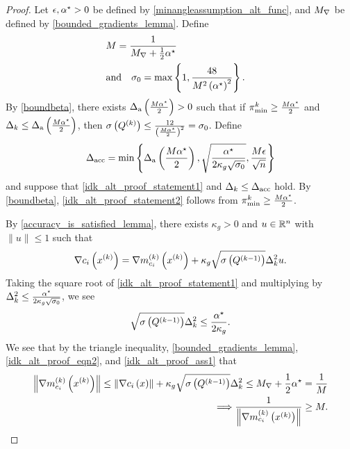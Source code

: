 \begin{proof}

Let $\epsilon, { \alpha^{\star} } > 0$ be defined by \cref{minangleassumption_alt_func}, and ${M_{\nabla}}$ be defined by \cref{bounded_gradients_lemma}.
Define
\begin{align}
&M = \frac 1 {{M_{\nabla}} + \frac 1 2 { \alpha^{\star} }} & \\
&\textrm{and} \quad \sigma_0 = \max\left\{1, \frac{48}{M^2\left({ \alpha^{\star} }\right)^2}\right\}.&
\end{align}
By \cref{boundbeta}, there exists ${\Delta_{\textrm{a}}} \left(\frac {M { \alpha^{\star} }} 2\right) > 0$ such that if
${\pi^k_{\textrm{min}}} \ge \frac {M { \alpha^{\star} }} 2$ and $\Delta_k \le {\Delta_{\textrm{a}}} \left(\frac {M { \alpha^{\star} }} 2\right)$,
then $\sigma\left({Q^{(k)}}\right) \le \frac{12}{\left(\frac{M{ \alpha^{\star} }}{2}\right)^2} = \sigma_0$.
Define 
\begin{align}
{\Delta_{\textrm{acc}}} = \min\left\{
{\Delta_{\textrm{a}}} \left(\frac {M { \alpha^{\star} }} 2\right), 
\sqrt{\frac {{ \alpha^{\star} }}{2\kappa_g\sqrt{\sigma_0}}},
\frac{M \epsilon}{\sqrt{n}}
\right\} \label{define_delta_accuracy2}
\end{align}
and suppose that \cref{idk_alt_proof_statement1} and $\Delta_k \le {\Delta_{\textrm{acc}}}$ hold.
By \cref{boundbeta}, \cref{idk_alt_proof_statement2} follows from ${\pi^k_{\textrm{min}}} \ge \frac {M { \alpha^{\star} }} 2$.


By \cref{accuracy_is_satisfied_lemma}, there exists $\kappa_{g} > 0$ and $u\in\mathbb R^n$ with $\|u\|\le 1$ such that
\begin{align}
\nabla c_i\left(x^{(k)}\right) = {\nabla m_{c_i}^{(k)}\left(x^{(k)}\right)} + \kappa_g \sqrt{\sigma\left( Q^{(k-1)} \right)}\Delta_k^2 u. \label{idk_alt_proof_eqn2}
\end{align}
Taking the square root of \cref{idk_alt_proof_statement1} and multiplying by $\Delta_k^2 \le \frac {{ \alpha^{\star} }}{2\kappa_g\sqrt{\sigma_0}}$, we see
\begin{align}
\sqrt{\sigma\left( Q^{(k-1)} \right)} \Delta_k^2 \le \frac {{ \alpha^{\star} }} {2\kappa_g}. \label{idk_alt_proof_ass1}
\end{align}
We see that by the triangle inequality, \cref{bounded_gradients_lemma}, \cref{idk_alt_proof_eqn2}, and \cref{idk_alt_proof_ass1} that
\begin{align}
\left\|{\nabla m_{c_i}^{(k)}\left(x^{(k)}\right)}\right\| \le \left\| \nabla c_i\left(x\right)\right\| + \kappa_g \sqrt{\sigma\left( Q^{(k-1)} \right)} \Delta_k^2 \le {M_{\nabla}} + \frac 1 2 { \alpha^{\star} } = \frac 1 M \nonumber \\
\Longrightarrow \frac 1 {\left\|{\nabla m_{c_i}^{(k)}\left(x^{(k)}\right)}\right\|} \ge M. \label{idk_alt_proof_eqn4}
\end{align}


\end{proof}

